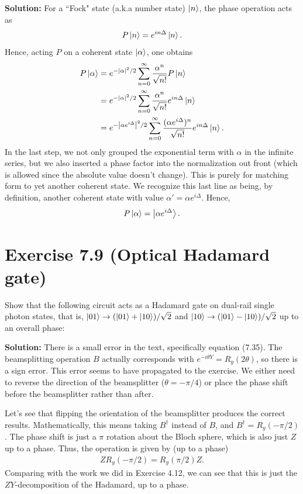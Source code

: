 \documentclass{book}
\begin{document}
    \textbf{Solution:} For a ``Fock" state (a.k.a number state) $\ket{n}$, the phase operation acts as 
    \begin{align}
        P\ket{n} = e^{i n \Delta} \ket{n}.
    \end{align}
    Hence, acting $P$ on a coherent state $\ket{\alpha}$, one obtains
    \begin{align}
    \begin{aligned}
        P \ket{\alpha} &= e^{-\abs{\alpha}^2/2} \sum_{n=0}^\infty \frac{\alpha^n}{\sqrt{n!}} P\ket{n} \\
        &= e^{-\abs{\alpha}^2/2} \sum_{n=0}^\infty \frac{\alpha^n}{\sqrt{n!}} e^{i n\Delta}\ket{n} \\
        &= e^{-\abs{\alpha e^{i\Delta}}^2/2} \sum_{n=0}^\infty \frac{(\alpha e^{i\Delta})^n}{\sqrt{n!}} e^{i n\Delta}\ket{n}.
    \end{aligned}
    \end{align}
    In the last step, we not only grouped the exponential term with $\alpha$ in the infinite series, but we also inserted a phase factor into the normalization out front (which is allowed since the absolute value doesn't change). This is purely for matching form to yet another coherent state. We recognize this last line as being, by definition, another coherent state with value $\alpha' = \alpha e^{i\Delta}$. Hence,
    \begin{align}
        P\ket{\alpha} = \ket{\alpha e^{i\Delta}}.
    \end{align}

\section*{Exercise 7.9 (Optical Hadamard gate)}
    Show that the following circuit acts as a Hadamard gate on  dual-rail single photon states, that is, $\ket{01} \to (\ket{01} + \ket{10})/\sqrt{2}$ and $\ket{10}\to (\ket{01} - \ket{10})/\sqrt{2}$ up to an overall phase:

    \textbf{Solution:} There is a small error in the text, specifically equation (7.35). The beamsplitting operation $B$ actually corresponds with $e^{-i\theta Y} = R_y (2\theta)$, so there is a sign error. This error seems to have propagated to the exercise. We either need to reverse the direction of the beamsplitter ($\theta = -\pi/4$) or place the phase shift before the beamsplitter rather than after.
    
    Let's see that flipping the orientation of the beamsplitter produces the correct results. Mathematically, this means taking $B^\dagger$ instead of $B$, and $B^\dagger = R_y(-\pi/2)$. The phase shift is just a $\pi$ rotation about the Bloch sphere, which is also just $Z$ up to a phase. Thus, the operation is given by (up to a phase)
    \begin{align}
        Z R_y(-\pi/2) = R_y(\pi/2) Z.
    \end{align}
    Comparing with the work we did in Exercise 4.12, we can see that this is just the $ZY$-decomposition of the Hadamard, up to a phase. 
    
\end{document}
